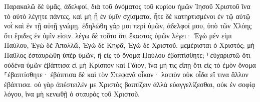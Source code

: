 \documentclass{openreader}
\begin{document}
Παρακαλῶ δὲ ὑμᾶς, ἀδελφοί, διὰ τοῦ ὀνόματος τοῦ κυρίου ἡμῶν Ἰησοῦ Χριστοῦ ἵνα τὸ αὐτὸ λέγητε πάντες, καὶ μὴ ᾖ ἐν ὑμῖν σχίσματα, ἦτε δὲ κατηρτισμένοι ἐν τῷ αὐτῷ νοῒ καὶ ἐν τῇ αὐτῇ γνώμῃ. 
ἐδηλώθη γάρ μοι περὶ ὑμῶν, ἀδελφοί μου, ὑπὸ τῶν Χλόης ὅτι ἔριδες ἐν ὑμῖν εἰσιν. 
λέγω δὲ τοῦτο ὅτι ἕκαστος ὑμῶν λέγει· Ἐγὼ μέν εἰμι Παύλου, Ἐγὼ δὲ Ἀπολλῶ, Ἐγὼ δὲ Κηφᾶ, Ἐγὼ δὲ Χριστοῦ. 
μεμέρισται ὁ Χριστός; μὴ Παῦλος ἐσταυρώθη ὑπὲρ ὑμῶν, ἢ εἰς τὸ ὄνομα Παύλου ἐβαπτίσθητε; 
⸀εὐχαριστῶ ὅτι οὐδένα ὑμῶν ἐβάπτισα εἰ μὴ Κρίσπον καὶ Γάϊον, 
ἵνα μή τις εἴπῃ ὅτι εἰς τὸ ἐμὸν ὄνομα ⸀ἐβαπτίσθητε· 
ἐβάπτισα δὲ καὶ τὸν Στεφανᾶ οἶκον· λοιπὸν οὐκ οἶδα εἴ τινα ἄλλον ἐβάπτισα. 
οὐ γὰρ ἀπέστειλέν με Χριστὸς βαπτίζειν ἀλλὰ εὐαγγελίζεσθαι, οὐκ ἐν σοφίᾳ λόγου, ἵνα μὴ κενωθῇ ὁ σταυρὸς τοῦ Χριστοῦ. 
\end{document}
